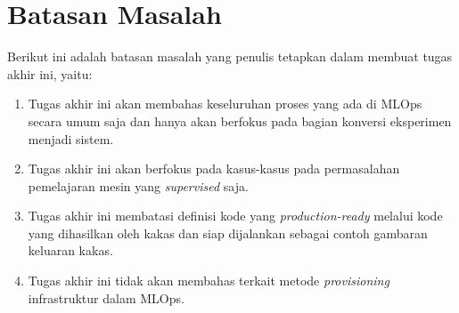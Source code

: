 \section{Batasan Masalah}

Berikut ini adalah batasan masalah yang penulis tetapkan dalam membuat tugas akhir ini, yaitu:

\begin{enumerate}
  \item Tugas akhir ini akan membahas keseluruhan proses yang ada di MLOps secara umum saja dan hanya akan berfokus pada bagian konversi eksperimen menjadi sistem.
  \item Tugas akhir ini akan berfokus pada kasus-kasus pada permasalahan pemelajaran mesin yang \textit{supervised} saja.
  \item Tugas akhir ini membatasi definisi kode yang \textit{production-ready} melalui kode yang dihasilkan oleh kakas dan siap dijalankan sebagai contoh gambaran keluaran kakas.
  \item Tugas akhir ini tidak akan membahas terkait metode \textit{provisioning} infrastruktur dalam MLOps. 
\end{enumerate}